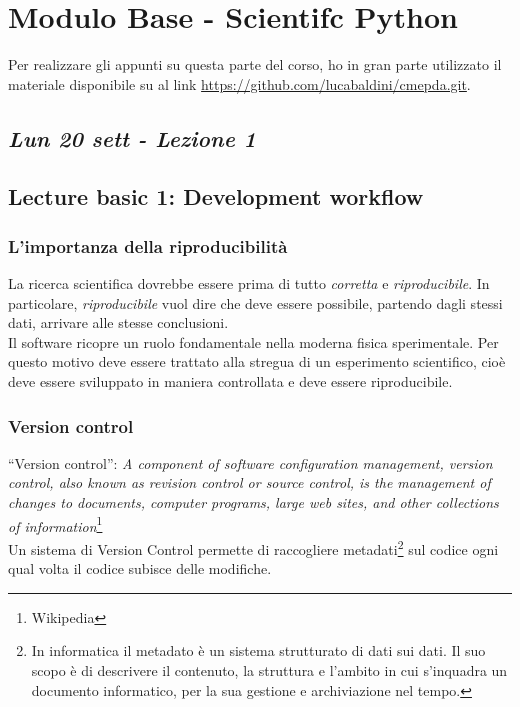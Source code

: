 \chapter{Modulo Base - Scientifc Python}

\vfill
Per realizzare gli appunti su questa parte del corso, ho in gran parte utilizzato il materiale disponibile su al link \url{https://github.com/lucabaldini/cmepda.git}.

\newpage
\section{\textit{Lun 20 sett - Lezione 1}}
\section{Lecture basic 1: Development workflow}

\subsection{L'importanza della riproducibilità}
La ricerca scientifica dovrebbe essere prima di tutto \textit{corretta} e \textit{riproducibile}. In particolare, \textit{riproducibile} vuol dire che deve essere possibile, partendo dagli stessi dati, arrivare alle stesse conclusioni.\\
Il software ricopre un ruolo fondamentale nella moderna fisica sperimentale. Per questo motivo deve essere trattato alla stregua di un esperimento scientifico, cioè deve essere sviluppato in maniera controllata e deve essere riproducibile.




\subsection{Version control}

“Version control”: \textit{A component of software configuration
management, version control, also known as revision control or
source control, is the management of changes to documents,
computer programs, large web sites, and other collections of
information}\footnote{Wikipedia}\\

Un sistema di Version Control permette di raccogliere metadati\footnote{In informatica il metadato è un sistema strutturato di dati sui dati. Il suo scopo è di descrivere il contenuto, la struttura e l’ambito in cui s’inquadra un documento informatico, per la sua gestione e archiviazione nel tempo.} sul codice ogni qual volta il codice subisce delle modifiche.


